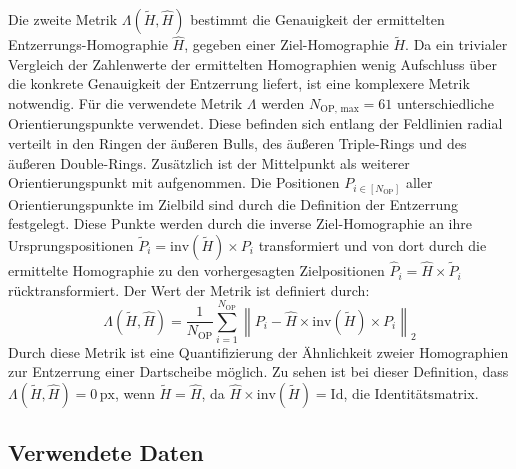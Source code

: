 Die zweite Metrik $\Lambda(\widetilde{H}, \widehat{H})$ bestimmt die Genauigkeit der ermittelten Entzerrungs-Homographie $\widehat{H}$, gegeben einer Ziel-Homographie $\widetilde{H}$. Da ein trivialer Vergleich der Zahlenwerte der ermittelten Homographien wenig Aufschluss über die konkrete Genauigkeit der Entzerrung liefert, ist eine komplexere Metrik notwendig. Für die verwendete Metrik $\Lambda$ werden $N_\text{OP, max}=61$ unterschiedliche Orientierungspunkte verwendet. Diese befinden sich entlang der Feldlinien radial verteilt in den Ringen der äußeren Bulls, des äußeren Triple-Rings und des äußeren Double-Rings. Zusätzlich ist der Mittelpunkt als weiterer Orientierungspunkt mit aufgenommen. Die Positionen $P_{i \in [N_\text{OP}]}$ aller Orientierungspunkte im Zielbild sind durch die Definition der Entzerrung festgelegt. Diese Punkte werden durch die inverse Ziel-Homographie an ihre Ursprungspositionen $\widetilde{P}_i = \mathrm{inv}(\widetilde{H}) \times P_i$ transformiert und von dort durch die ermittelte Homographie zu den vorhergesagten Zielpositionen $\widehat{P}_i = \widehat{H} \times \widetilde{P}_i$ rücktransformiert. Der Wert der Metrik ist definiert durch:
\[ \Lambda(\widetilde{H}, \widehat{H}) = \frac{1}{N_\text{OP}} \sum_{i = 1}^{N_\text{OP}} \left\lVert P_i - \widehat{H} \times \mathrm{inv}(\widetilde{H}) \times P_i \right\rVert _2  \]
Durch diese Metrik ist eine Quantifizierung der Ähnlichkeit zweier Homographien zur Entzerrung einer Dartscheibe möglich. Zu sehen ist bei dieser Definition, dass $\Lambda(\widetilde{H}, \widehat{H}) = 0\,\text{px}$, wenn $\widetilde{H} = \widehat{H}$, da $\widehat{H} \times \mathrm{inv}(\widetilde{H}) = \text{Id}$, die Identitätsmatrix.


\subsection{Verwendete Daten}
\label{sec:cv_ergebnisse_daten}


